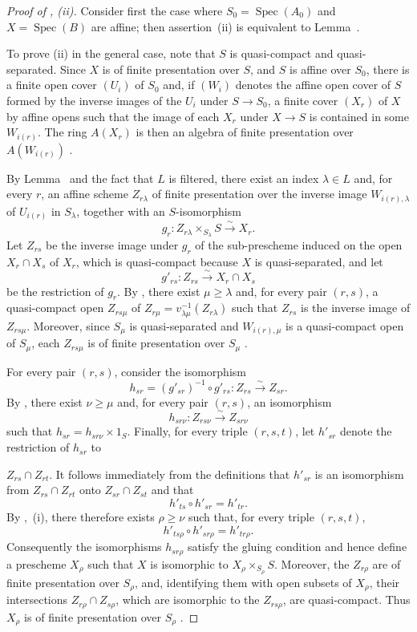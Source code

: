 \begin{proof}[Proof of , (ii)]
Consider first the case where $S_0=\operatorname{Spec}(A_0)$ and $X=\operatorname{Spec}(B)$ are affine; then assertion~(ii) is equivalent to Lemma~.

To prove (ii) in the general case, note that $S$ is quasi-compact and quasi-separated. Since $X$ is of finite presentation over $S$, and $S$ is affine over $S_0$, there is a finite open cover $(U_i)$ of $S_0$ and, if $(W_i)$ denotes the affine open cover of $S$ formed by the inverse images of the $U_i$ under $S\to S_0$, a finite cover $(X_r)$ of $X$ by affine opens such that the image of each $X_r$ under $X\to S$ is contained in some $W_{i(r)}$. The ring $A(X_r)$ is then an algebra of finite presentation over $A(W_{i(r)})$ .

By Lemma~ and the fact that $L$ is filtered, there exist an index $\lambda\in L$ and, for every $r$, an affine scheme $Z_{r\lambda}$ of finite presentation over the inverse image $W_{i(r),\lambda}$ of $U_{i(r)}$ in $S_\lambda$, together with an $S$-isomorphism
\[
 g_r:Z_{r\lambda}\times_{S_\lambda}S\xrightarrow{\sim}X_r.
\]
Let $Z_{rs}$ be the inverse image under $g_r$ of the sub-prescheme induced on the open $X_r\cap X_s$ of $X_r$, which is quasi-compact because $X$ is quasi-separated, and let
\[
 g'_{rs}:Z_{rs}\xrightarrow{\sim}X_r\cap X_s
\]
be the restriction of $g_r$. By , there exist $\mu\geqslant\lambda$ and, for every pair $(r,s)$, a quasi-compact open $Z_{rs\mu}$ of $Z_{r\mu}=v_{\lambda\mu}^{-1}(Z_{r\lambda})$ such that $Z_{rs}$ is the inverse image of $Z_{rs\mu}$. Moreover, since $S_\mu$ is quasi-separated and $W_{i(r),\mu}$ is a quasi-compact open of $S_\mu$, each $Z_{rs\mu}$ is of finite presentation over $S_\mu$ .

For every pair $(r,s)$, consider the isomorphism
\[
 h_{sr}=(g'_{sr})^{-1}\circ g'_{rs}:Z_{rs}\xrightarrow{\sim}Z_{sr}.
\]
By , there exist $\nu\geqslant\mu$ and, for every pair $(r,s)$, an isomorphism
\[
 h_{sr\nu}:Z_{rs\nu}\xrightarrow{\sim}Z_{sr\nu}
\]
such that $h_{sr}=h_{sr\nu}\times 1_S$. Finally, for every triple $(r,s,t)$, let $h'_{sr}$ denote the restriction of $h_{sr}$ to


$Z_{rs}\cap Z_{rt}$. It follows immediately from the definitions that $h'_{sr}$ is an isomorphism from $Z_{rs}\cap Z_{rt}$ onto $Z_{sr}\cap Z_{st}$ and that
\[
 h'_{ts}\circ h'_{sr}=h'_{tr}.
\]
By ,~(i), there therefore exists $\rho\geqslant\nu$ such that, for every triple $(r,s,t)$,
\[
 h'_{ts\rho}\circ h'_{sr\rho}=h'_{tr\rho}.
\]
Consequently the isomorphisms $h_{sr\rho}$ satisfy the gluing condition  and hence define a prescheme $X_\rho$ such that $X$ is isomorphic to $X_\rho\times_{S_\rho}S$. Moreover, the $Z_{r\rho}$ are of finite presentation over $S_\rho$, and, identifying them with open subsets of $X_\rho$, their intersections $Z_{r\rho}\cap Z_{s\rho}$, which are isomorphic to the $Z_{rs\rho}$, are quasi-compact. Thus $X_\rho$ is of finite presentation over $S_\rho$ .
\end{proof}

